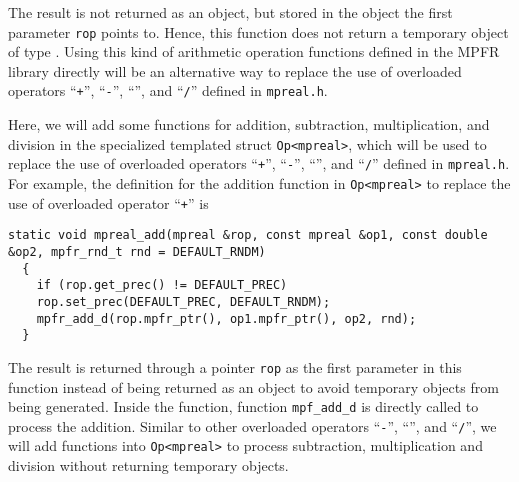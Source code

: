 The result is not returned as an object, but stored in the object the first parameter \texttt{rop} points to. Hence, this function does not return a temporary object of type \mpreal. Using this kind of arithmetic operation functions defined in the MPFR library directly will be an alternative way to replace the use of overloaded operators ``{\tt +}'', ``{\tt -}'', ``{\tt *}'', and ``{\tt /}'' defined in {\tt mpreal.h}.

Here, we will add some functions for addition, subtraction, multiplication, and division in the specialized templated struct {\tt Op<mpreal>}, which will be used to replace the use of overloaded operators ``{\tt +}'', ``{\tt -}'', ``{\tt *}'', and ``{\tt /}'' defined in {\tt mpreal.h}.
For example, the definition for the addition function in {\tt Op<mpreal>} to replace the use of overloaded operator ``{\tt +}'' is
\begin{lstlisting}[numbers=none]
  static void mpreal_add(mpreal &rop, const mpreal &op1, const double &op2, mpfr_rnd_t rnd = DEFAULT_RNDM)
  {
  	if (rop.get_prec() != DEFAULT_PREC)
  	rop.set_prec(DEFAULT_PREC, DEFAULT_RNDM);
  	mpfr_add_d(rop.mpfr_ptr(), op1.mpfr_ptr(), op2, rnd);
  }
\end{lstlisting}

The result is returned through a pointer \texttt{rop} as the first parameter in this function instead of being returned as an object to avoid temporary objects from being generated. Inside the function, function {\tt mpf\_add\_d} is directly called to process the addition. Similar to other overloaded operators ``{\tt -}'', ``{\tt *}'', and ``{\tt /}'', we will add functions into {\tt Op<mpreal>} to process subtraction, multiplication and division without returning temporary objects.
